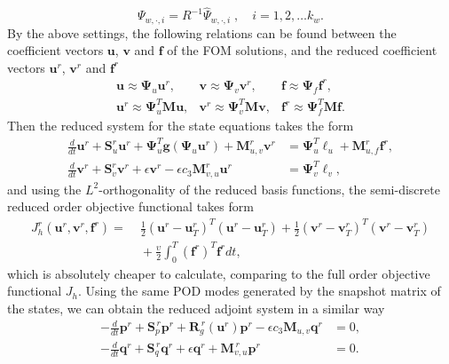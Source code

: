 \documentclass[preprint,12pt]{elsarticle}
\begin{document}
$$
\Psi_{w,\cdot ,i}=R^{-1}\widehat{\Psi}_{w,\cdot ,i} \; , \quad i=1,2,\ldots k_w.
$$
By the above settings, the following relations can be found between the coefficient vectors $\bm{u}$, $\bm{v}$ and $\bm{f}$ of the FOM solutions, and the reduced coefficient vectors $\bm{u}^r$, $\bm{v}^r$ and $\bm{f}^r$
\begin{eqnarray*}
\bm{u} \approx \bm{\Psi}_u \bm{u}^r, & \bm{v} \approx \bm{\Psi}_v \bm{v}^r, & \bm{f} \approx \bm{\Psi}_f \bm{f}^r,\\
\bm{u}^r \approx \bm{\Psi}_u^T{\bm M} \bm{u}, & \bm{v}^r \approx \bm{\Psi}_v^T{\bm M} \bm{v}, & \bm{f}^r \approx \bm{\Psi}_f^T{\bm M} \bm{f}.
\end{eqnarray*}
Then the reduced system for the state equations takes the form
\begin{equation}\label{staterom}
\begin{aligned}
  \frac{d}{dt} \bm{u}^r +  \bm{S}^r_u \bm{u}^r   + \bm{\Psi}_u^T \bm{g}(\bm{\Psi}_u \bm{u}^r)
  + \bm{M}_{u,v}^r \bm{v}^r  &=  \bm{\Psi}_u^T \bm{\ell}_u + \bm{M}_{u,f}^r \bm{f}^r, \\
 \frac{d}{dt} \bm{v}^r +  \bm{S}^r_v \bm{v}^r  + \epsilon \bm{v}^r
- \epsilon c_3 \bm{M}^r_{v,u} \bm{u}^r &=  \bm{\Psi}_v^T \bm{\ell}_v,
\end{aligned}
\end{equation}
and using the $L^2$-orthogonality of the reduced basis functions, the semi-discrete reduced order objective functional takes form
\begin{align*}
J_h^r(\bm{u}^r,\bm{v}^r,\bm{f}^r) = & \; \frac{1}{2}(\bm{u}^r-\bm{u}^r_T)^T(\bm{u}^r-\bm{u}^r_T) + \frac{1}{2}(\bm{v}^r-\bm{v}^r_T)^T(\bm{v}^r-\bm{v}^r_T) \\
& \; + \frac{\upsilon}{2}\int_0^T(\bm{f}^r)^T\bm{f}^rdt,
\end{align*}
which is absolutely cheaper to calculate, comparing to the full order objective functional $J_h$.
Using the same POD modes generated by the snapshot matrix of the states, we can obtain the reduced adjoint system in a similar way
\begin{equation}\label{romadjoint}
\begin{aligned}
  -\frac{d}{dt} \bm{p}^r +  \bm{S}_p^{\,r} \bm{p}^r + \bm{R}_g^{\,r}(\bm{u}^{r}) \bm{p}^r
  -\epsilon c_3 \bm{M}_{u,v} \bm{q}^r  &=  0, \\
 -\frac{d}{dt} \bm{q}^r +  \bm{S}_q^{\,r} \bm{q}^r
 + \epsilon \bm{q}^r  +  \bm{M}_{v,u}^{\,r} \bm{p}^r  &= 0.
\end{aligned}
\end{equation}
\end{document}
